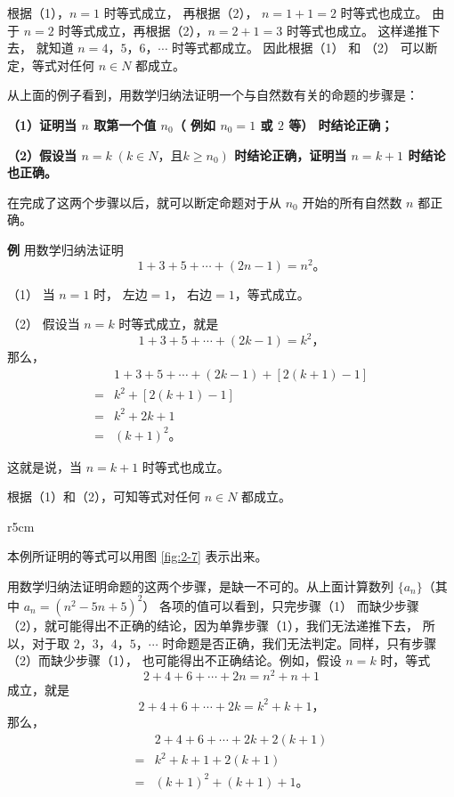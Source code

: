根据（1），$n = 1$ 时等式成立， 再根据（2）， $n = 1 + 1 = 2$ 时等式也成立。
由于 $n = 2$ 时等式成立，再根据（2），$n = 2 + 1 = 3$ 时等式也成立。
这样递推下去， 就知道 $n = 4$，$5$，$6$，$\cdots$ 时等式都成立。
因此根据（1） 和 （2） 可以断定，等式对任何 $n \in N$ 都成立。

从上面的例子看到，用数学归纳法证明一个与自然数有关的命题的步骤是：

\textbf{（1）证明当 $n$ 取第一个值 $n_0$（ 例如 $n_0 = 1$ 或 $2$ 等） 时结论正确；}

\textbf{（2）假设当 $n = k \; (k \in N \text{，且} k \geqslant n_0)$ 时结论正确，证明当 $n = k + 1$ 时结论也正确。}

在完成了这两个步骤以后，就可以断定命题对于从 $n_0$ 开始的所有自然数 $n$ 都正确。

\textbf{例} \quad 用数学归纳法证明
$$ 1 + 3 + 5 + \cdots + (2n - 1) = n^2 \text{。} $$

\zhengming （1） 当 $n = 1$ 时， 左边$=1$， 右边$= 1$，等式成立。

（2） 假设当 $n = k$ 时等式成立，就是
$$ 1 + 3 + 5 + \cdots + (2k - 1) = k^2 \text{，} $$
那么，
\begin{align*}
      & 1 + 3 + 5 + \cdots + (2k - 1) + [2(k + 1) - 1] \\
    = & k^2 + [2(k + 1) - 1] \\
    = & k^2 + 2k + 1 \\
    = & (k + 1)^2 \text{。}
\end{align*}

这就是说，当 $n = k + 1$ 时等式也成立。

根据（1）和（2），可知等式对任何 $n \in N$ 都成立。

\begin{wrapfigure}[17]{r}{5cm}
    \centering
    
    \caption{}\label{fig:2-7}
\end{wrapfigure}


本例所证明的等式可以用图 \ref{fig:2-7} 表示出来。

用数学归纳法证明命题的这两个步骤，是缺一不可的。从上面计算数列 $\{a_n\}$（其中 $a_n = (n^2 - 5n + 5)^2$）
各项的值可以看到，只完步骤（1） 而缺少步骤（2），就可能得出不正确的结论，因为单靠步骤（1），我们无法递推下去，
所以，对于取 $2$，$3$，$4$，$5$，$\cdots$ 时命题是否正确，我们无法判定。同样，只有步骤（2）而缺少步骤（1），
也可能得出不正确结论。例如，假设 $n = k$ 时，等式
$$ 2 + 4 + 6 + \cdots + 2n = n^2 + n + 1 $$
成立，就是
$$ 2 + 4 + 6 + \cdots + 2k = k^2 + k + 1 \text{，} $$
那么，
\begin{align*}
      & 2 + 4 + 6 + \cdots + 2k + 2(k + 1) \\
    = & k^2 + k + 1 + 2(k + 1) \\
    = & (k + 1)^2 + (k + 1) + 1 \text{。}
\end{align*}

